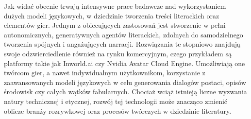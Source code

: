 Jak widać obecnie trwają intensywne prace badawcze nad wykorzystaniem dużych modeli językowych,
w dziedzinie tworzenia treści literackich oraz elementów gier. Jednym z
obiecujących zastosowań jest stworzenie w pełni autonomicznych, generatywnych agentów literackich,
zdolnych do samodzielnego tworzenia spójnych i angażujących narracji. Rozwiązania te stopniowo
znajdują swoje odzwierciedlenie również na rynku komercyjnym, czego przykładem są platformy takie
jak Inworld.ai czy Nvidia Avatar Cloud Engine. Umożliwiają one twórcom gier, a nawet indywidualnym
użytkownikom, korzystanie z zaawansowanych modeli językowych w celu generowania dialogów postaci,
opisów środowisk czy całych wątków fabularnych. Chociaż wciąż istnieją liczne wyzwania natury
technicznej i etycznej, rozwój tej technologii może znacząco zmienić oblicze branży rozrywkowej
oraz procesów twórczych w dziedzinie literatury.